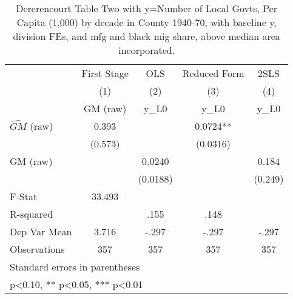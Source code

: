 \begin{table}[htbp]\centering
\def\sym#1{\ifmmode^{#1}\else\(^{#1}\)\fi}
\caption{Dererencourt Table Two with y=Number of Local Govts, Per Capita (1,000) by decade in County 1940-70, with baseline y, division FEs, and mfg and black mig share, above median area incorporated.}
\begin{tabular}{l*{4}{c}}
\toprule
                    & First Stage   &         OLS   &Reduced Form   &        2SLS   \\
                    &\multicolumn{1}{c}{(1)}&\multicolumn{1}{c}{(2)}&\multicolumn{1}{c}{(3)}&\multicolumn{1}{c}{(4)}\\
                    &\multicolumn{1}{c}{GM  (raw)}&\multicolumn{1}{c}{y\_L0}&\multicolumn{1}{c}{y\_L0}&\multicolumn{1}{c}{y\_L0}\\
\midrule
$\hat{GM}$ (raw)    &       0.393   &               &      0.0724** &               \\
                    &     (0.573)   &               &    (0.0316)   &               \\
\addlinespace
GM  (raw)           &               &      0.0240   &               &       0.184   \\
                    &               &    (0.0188)   &               &     (0.249)   \\
\midrule
F-Stat              &      33.493   &               &               &               \\
R-squared           &               &        .155   &        .148   &               \\
Dep Var Mean        &       3.716   &       -.297   &       -.297   &       -.297   \\
Observations        &         357   &         357   &         357   &         357   \\
\bottomrule
\multicolumn{5}{l}{\footnotesize Standard errors in parentheses}\\
\multicolumn{5}{l}{\footnotesize * p<0.10, ** p<0.05, *** p<0.01}\\
\end{tabular}
\end{table}
